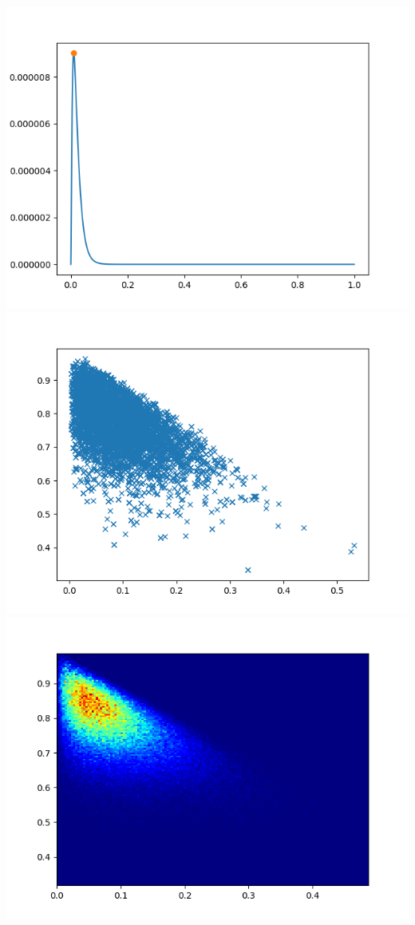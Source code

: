 \documentclass[pt12]{article}
\begin{document}
\newpage

\begin{center}
\includegraphics[scale=0.5]{hip16.png}\\
\includegraphics[scale=0.5]{sc16.png}\\
\includegraphics[scale=0.5]{den16.png}\\
\end{center}
\end{document}
